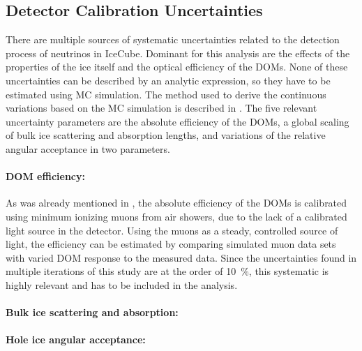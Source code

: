 

\subsection{Detector Calibration Uncertainties}

There are multiple sources of systematic uncertainties related to the detection process of neutrinos in IceCube. Dominant for this analysis are the effects of the properties of the ice itself and the optical efficiency of the DOMs. None of these uncertainties can be described by an analytic expression, so they have to be estimated using MC simulation. The method used to derive the continuous variations based on the MC simulation is described in . The five relevant uncertainty parameters are the absolute efficiency of the DOMs, a global scaling of bulk ice scattering and absorption lengths, and variations of the relative angular acceptance in two parameters.

\paragraph{DOM efficiency:}
As was already mentioned in , the absolute efficiency of the DOMs is calibrated using minimum ionizing muons from air showers, due to the lack of a calibrated light source in the detector. Using the muons as a steady, controlled source of light, the efficiency can be estimated by comparing simulated muon data sets with varied DOM response to the measured data. Since the uncertainties found in multiple iterations of this study  are at the order of \SI{10}{\percent}, this systematic is highly relevant and has to be included in the analysis.

\paragraph{Bulk ice scattering and absorption:}



\paragraph{Hole ice angular acceptance:}




